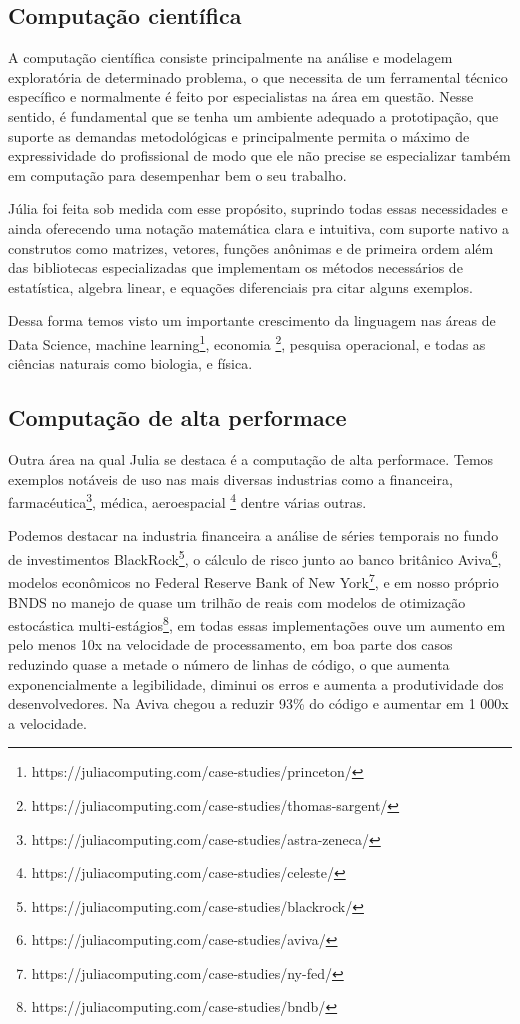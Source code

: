 \subsection{Computação científica}

A computação científica consiste principalmente na análise e modelagem exploratória de determinado problema, o que necessita de um ferramental técnico específico e normalmente é feito por especialistas na área em questão. Nesse sentido, é fundamental que se tenha um ambiente adequado a prototipação, que suporte as demandas metodológicas e principalmente permita o máximo de expressividade do profissional de modo que ele não precise se especializar também em computação para desempenhar bem o seu trabalho. 

Júlia foi feita sob medida com esse propósito, suprindo todas essas necessidades e ainda oferecendo uma notação matemática clara e intuitiva, com suporte nativo a construtos como matrizes, vetores, funções anônimas e de primeira ordem além das bibliotecas especializadas que implementam os métodos necessários de estatística, algebra linear, e equações diferenciais pra citar alguns exemplos. \cite{Klok2021}

Dessa forma temos visto um importante crescimento da linguagem nas áreas de Data Science, machine learning\footnote{https://juliacomputing.com/case-studies/princeton/}, 
economia \footnote{https://juliacomputing.com/case-studies/thomas-sargent/}, 
pesquisa operacional, e todas as ciências naturais como biologia, e física. \cite{Perkel2019}

\subsection{Computação de alta performace}
Outra área na qual Julia se destaca é a computação de alta performace. Temos exemplos notáveis de uso nas mais diversas industrias como a financeira, farmacéutica\footnote{https://juliacomputing.com/case-studies/astra-zeneca/}, médica, aeroespacial \footnote{https://juliacomputing.com/case-studies/celeste/} dentre várias outras. 

Podemos destacar na industria financeira a análise de séries temporais no fundo de investimentos BlackRock\footnote{https://juliacomputing.com/case-studies/blackrock/}, o cálculo de risco junto ao banco britânico Aviva\footnote{https://juliacomputing.com/case-studies/aviva/}, modelos econômicos no Federal Reserve Bank of New York\footnote{https://juliacomputing.com/case-studies/ny-fed/}, e em nosso próprio BNDS no manejo de quase um trilhão de reais com modelos de otimização estocástica multi-estágios\footnote{https://juliacomputing.com/case-studies/bndb/}, em todas essas implementações ouve um aumento em pelo menos 10x na velocidade de processamento, em boa parte dos casos reduzindo quase a metade o número de linhas de código, o que aumenta exponencialmente a legibilidade, diminui os erros e aumenta a produtividade dos desenvolvedores. Na Aviva chegou a reduzir 93\% do código e aumentar em 1 000x a velocidade. 

